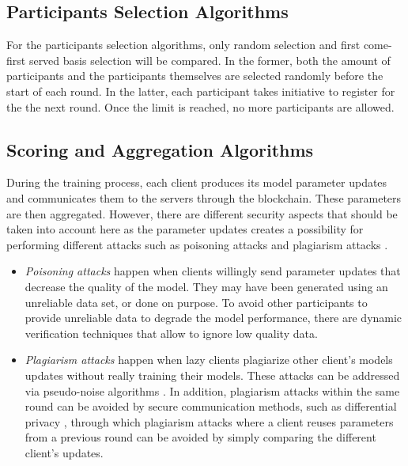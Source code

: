 \subsection{Participants Selection Algorithms}

For the participants selection algorithms, only random selection and first come-first served basis selection will be compared. In the former, both the amount of participants and the participants themselves are selected randomly before the start of each round. In the latter, each participant takes initiative to register for the the next round. Once the limit is reached, no more participants are allowed.

\subsection{Scoring and Aggregation Algorithms}
\label{background:scoring}

During the training process, each client produces its model parameter updates and communicates them to the servers through the blockchain. These parameters are then aggregated. However, there are different security aspects that should be taken into account here as the parameter updates creates a possibility for performing different attacks such as poisoning attacks \cite{9134967} and plagiarism attacks \cite{10.48550/arxiv.2009.09338}.

\begin{itemize}
    \item \textit{Poisoning attacks} happen when clients willingly send parameter updates that decrease the quality of the model. They may have been generated using an unreliable data set, or done on purpose. To avoid other participants to provide unreliable data to degrade the model performance, there are dynamic verification techniques \cite{10.48550/arxiv.2110.02182, 10.48550/arxiv.2104.10501} that allow to ignore low quality data.
    
    \item \textit{Plagiarism attacks} happen when lazy clients plagiarize other client's models updates without really training their models. These attacks can be addressed via pseudo-noise algorithms \cite{9403374}. In addition, plagiarism attacks within the same round can be avoided by secure communication methods, such as differential privacy \cite{10.48550/arxiv.2009.09338}, through which plagiarism attacks where a client reuses parameters from a previous round can be avoided by simply comparing the different client's updates.
\end{itemize}

